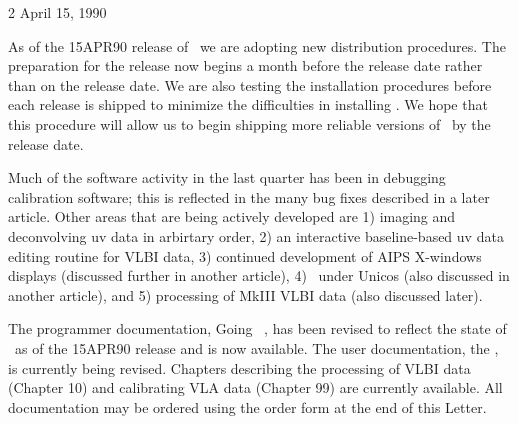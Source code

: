 

 {2} {April 15, 1990}

   As of the 15APR90 release of \AIPS\ we are adopting new distribution
procedures.  The preparation for the release now begins a month before
the release date rather than on the release date.  We are also testing
the installation procedures before each release is shipped to minimize
the difficulties in installing \AIPS .  We hope that this procedure
will allow us to begin shipping more reliable versions of \AIPS\ by
the release date.


   Much of the software activity in the last quarter has been in
debugging calibration software; this is reflected in the many bug
fixes described in a later article.  Other areas that are being
actively developed are 1) imaging and deconvolving uv data in
arbirtary order, 2) an interactive baseline-based uv data editing
routine for VLBI data, 3) continued development of AIPS X-windows
displays (discussed further in another article), 4) \AIPS\ under Unicos
(also discussed in another article), and 5) processing of MkIII VLBI
data (also discussed later).

   The programmer documentation, Going \AIPS\ , has been revised to
reflect the state of \AIPS\ as of the 15APR90 release and is now
available.  The user documentation, the \Cookbook , is currently being
revised.  Chapters describing the processing of VLBI data (Chapter 10)
and calibrating VLA data (Chapter 99) are currently available.  All
documentation may be ordered using the order form at the end of this
\AIPS Letter.

